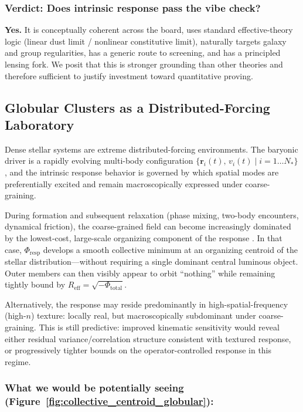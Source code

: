 \documentclass[11pt]{article}
\begin{document}
\subsubsection{Verdict: Does intrinsic response pass the vibe check?}

\textbf{Yes.} It is conceptually coherent across the board, uses standard effective-theory 
logic (linear dust limit / nonlinear constitutive limit), naturally targets galaxy and group 
regularities, has a generic route to screening, and has a principled lensing fork. We posit 
that this is stronger grounding than other theories and therefore sufficient to justify 
investment toward quantitative proving.

\subsection{Globular Clusters as a Distributed-Forcing Laboratory}\label{e.5-globular-clusters}

Dense stellar systems are extreme distributed-forcing environments. The baryonic driver is 
a rapidly evolving multi-body configuration $\{\mathbf{r}_i(t), \, v_i(t) \mid i = 1 \ldots N_*\}$, 
and the intrinsic response behavior is governed by which spatial modes are preferentially 
excited and remain macroscopically expressed under coarse-graining.

During formation and subsequent relaxation (phase mixing, two-body encounters, dynamical 
friction), the coarse-grained field can become increasingly dominated by the lowest-cost, 
large-scale organizing component of the response \citep{Bullock2017}. In that case, $\Phi_{\text{resp}}$ develops 
a smooth collective minimum at an organizing centroid of the stellar distribution---without 
requiring a single dominant central luminous object. Outer members can then visibly appear 
to orbit ``nothing'' while remaining tightly bound by $R_{\text{eff}} = \sqrt{-\Phi_{\text{total}}}$.

Alternatively, the response may reside predominantly in high-spatial-frequency (high-$n$) 
texture: locally real, but macroscopically subdominant under coarse-graining. This is still 
predictive: improved kinematic sensitivity would reveal either residual variance/correlation 
structure consistent with textured response, or progressively tighter bounds on the 
operator-controlled response in this regime.

\subsubsection{What we would be potentially seeing (Figure~\ref{fig:collective_centroid_globular}):}
\end{document}
